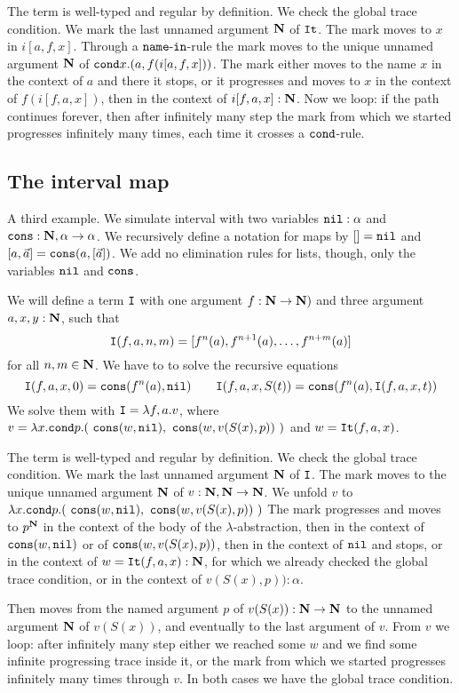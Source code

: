 \documentclass{article}
\begin{document}
The term is well-typed and regular by definition. We check the global trace condition. 
We mark the last unnamed argument ${\bf N}$ of ${\tt It}$. The mark moves to $x$ in $ i[a,f,x]$.
 Through a ${\tt name\mbox{-}in}$-rule the mark moves to the unique unnamed argument ${\bf N}$ of  
$ {\tt cond} x. (a, f( i[a,f,x]) )$.
The mark either moves to the name $x$ in the context of $a$ and there it stops, or 
it progresses and moves to $x$ in the context of $f(i[f,a,x])$, then in the context of $i[f,a,x]:{\bf N}$.
Now we loop: if the path continues forever, then after infinitely many step the mark from which we started 
progresses infinitely many times, each time it crosses a ${\tt cond}$-rule.



\subsection{The interval map}
A third example. We simulate interval with two variables ${\tt nil}:\alpha$ and 
${\tt cons}:{\bf N},\alpha \rightarrow \alpha$. We recursively define a notation for maps by $[]={\tt nil}$
and $[a,\vec{a}] = {\tt cons}(a,[\vec{a}])$. We add no elimination rules for lists, though,
only the variables ${\tt nil}$ and ${\tt cons}$.

We will define a term ${\tt I}$ with one argument $f:{\bf N} \rightarrow {\bf N})$ and three argument
$a,x,y:{\bf N}$, such that 
$$
{\tt I}(f,a,n,m) = [f^n(a), f^{n+1}(a), \ldots, f^{n+m}(a)]
$$ 
for all $n,m \in {\bf N}$. 
We have to to solve the recursive equations 
$$
\Interval(f,a,x,0) = \cons(f^n(a), \nil) 
\ \ \ \ \ \ 
\Interval(f,a,x,S(t)) = \cons(f^n(a), \Interval(f,a,x,t) )
$$ 
We solve them with ${\tt I} = \lambda f,a.v$,
where $v = \lambda x.{\tt cond} p. (\ {\tt cons}(w, {\tt nil}),  \  {\tt cons}(w, v(S(x),p)) \ )$ and $w={\tt It}(f,a,x)$.

The term is well-typed and regular by definition. We check the global trace condition.
We mark the last unnamed argument ${\bf N}$ of ${\tt I}$.
The mark moves to the unique unnamed argument ${\bf N}$ of  
$v:{\bf N},{\bf N} \rightarrow {\bf N}$. 
We unfold $v$ to $\lambda x.{\tt cond} p. 
(\ {\tt cons}(w, {\tt nil}),  \  {\tt cons}(w, v(S(x),p)) \ )$
The mark progresses and moves to $p^{\bf N}$ in the context of the body of the $\lambda$-abstraction,
then in the context of ${\tt cons}(w, {\tt nil})$ or of ${\tt cons}(w, v(S(x),p))$,
then in the context of ${\tt nil}$ and stops, or in the context of $w={\tt It}(f,a,x):{\bf N}$, 
for which we already checked the global trace condition, or in the context of $v(S(x),p)):\alpha$. 

Then moves from the named argument $p$ of $v(S(x)):{\bf N} \rightarrow {\bf N}$ to the 
unnamed argument ${\bf N}$ of $v(S(x))$, and eventually to the last argument of $v$. 
From $v$ we loop: after infinitely many step either we reached some $w$ and we find 
some infinite progressing trace inside it, or the
mark from which we started progresses infinitely many times through $v$. In both cases we have the
global trace condition.
\end{document}
